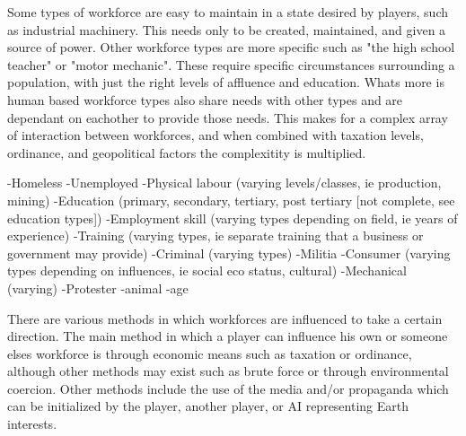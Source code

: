 Some types of workforce are easy to maintain in a state desired by players, such as industrial machinery. This needs only to be created, maintained, and given a source of power. Other workforce types are more specific such as "the high school teacher" or "motor mechanic". These require specific circumstances surrounding a population, with just the right levels of affluence and education. Whats more is human based workforce types also share needs with other types and are dependant on eachother to provide those needs. This makes for a complex array of interaction between workforces, and when combined with taxation levels, ordinance, and geopolitical factors the complexitity is multiplied.


-Homeless
-Unemployed
-Physical labour (varying levels/classes, ie production, mining)
-Education (primary, secondary, tertiary, post tertiary [not complete, see education types])
-Employment skill (varying types depending on field, ie years of experience)
-Training (varying types, ie separate training that a business or government may provide)
-Criminal (varying types)
-Militia
-Consumer (varying types depending on influences, ie social eco status, cultural)
-Mechanical (varying) 
-Protester
-animal
-age







There are various methods in which workforces are influenced to take a certain direction. The main method in which a player can influence his own or someone elses workforce is through economic means such as taxation or ordinance, although other methods may exist such as brute force or through environmental coercion. Other methods include the use of the media and/or propaganda which can be initialized by the player, another player, or AI representing Earth interests.











 










